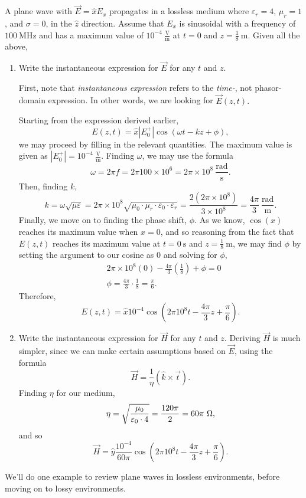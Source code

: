 \documentclass{article}
\begin{document}
A plane wave with \(\vec{E} = \hat{x}E_x\) propagates in a lossless medium where \(\varepsilon_r = 4\), \(\mu_r = 1\), and \(\sigma = 0\), in the \(\hat{z}\) direction. Assume that \(E_x\) is sinusoidal with a frequency of \(100 \ \mathrm{MHz}\) and has a maximum value of \(10^{-4} \ \mathrm{\frac{V}{m}}\) at \(t=0\) and \(z=\frac{1}{8} \ \mathrm{m}\). Given all the above, 
\begin{enumerate}[label=\alph*)]
	\item Write the instantaneous expression for \(\vec{E}\) for any \(t\) and \(z\). 

	First, note that \textit{instantaneous expression} refers to the \textit{time-}, not phasor-domain expression. In other words, we are looking for \(\vec{E}(z,t).\)

	Starting from the expression derived earlier,
	\[
		E(z,t) = \hat{x}|E_0^+|\cos{(\omega t - kz + \phi)},
	\]
	we may proceed by filling in the relevant quantities. The maximum value is given as \(|E_0^+| = 10^{-4} \ \mathrm{\frac{V}{m}}\). Finding \(\omega\), we may use the formula
	\[
		\omega = 2\pi f = 2\pi 100 \times 10^6 = 2\pi \times 10^8 \ \mathrm{\frac{rad}{s}}.
	\]
	Then, finding \(k\),
	\[
		k = \omega \sqrt{\mu \varepsilon} = 2\pi \times 10^8 \sqrt{\mu_0 \cdot \mu_r \cdot \varepsilon_0 \cdot \varepsilon_r} = \frac{2(2\pi \times 10^8)}{3\times10^8} = \frac{4\pi}{3} \ \mathrm{\frac{rad}{m}}.
	\]
	Finally, we move on to finding the phase shift, \(\phi\). As we know, \(\cos{(x)}\) reaches its maximum value when \(x = 0\), and so reasoning from the fact that \(E(z,t)\) reaches its maximum value at \(t=0 \ \mathrm{s}\) and \(z=\frac{1}{8} \ \mathrm{m}\), we may find \(\phi\) by setting the argument to our cosine as \(0\) and solving for \(\phi\),
	\begin{align*}
		&2\pi \times 10^8(0) - \frac{4\pi}{3}\left(\frac{1}{8}\right) + \phi = 0 \\
		&\phi = \frac{4\pi}{3} \cdot \frac{1}{8} = \frac{\pi}{6}. 
	\end{align*}
	Therefore, 
	\[
		E(z,t) = \hat{x}10^{-4}\cos{(2\pi 10^8t-\frac{4\pi}{3}z+\frac{\pi}{6})}.
	\]
	\item Write the instantaneous expression for \(\vec{H}\) for any \(t\) and \(z\).
		Deriving \(\vec{H}\) is much simpler, since we can make certain assumptions based on \(\vec{E}\), using the formula
		\[
		  \vec{H} = \frac{1}{\eta}(\hat{k} \times \vec{t}).
		\]
		Finding \(\eta\) for our medium,
		\[
		\eta = \sqrt{\frac{\mu_0}{\varepsilon_0 \cdot 4}} = \frac{120\pi}{2} = 60\pi \ \ohm,
		\]
		and so 
		\[
			\vec{H} = \hat{y}\frac{10^{-4}}{60\pi}\cos{(2\pi 10^8t - \frac{4\pi}{3}z + \frac{\pi}{6})}.
		\]
\end{enumerate}
		We'll do one example to review plane waves in lossless environments, before moving on to lossy environments.
\end{document}
